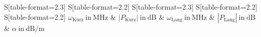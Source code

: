 \begin{table}
    \centering
    \caption{Frequenz $\omega$ und Betrag der Amplitude $P$ der Peaks in der FFT für das kurze und das lange Kabel, sowie mit \eqref{eq:Daempfung} berechnete Dämpfung}
    \label{tab:DaempfungWerte}
    \begin{tabular}{
	S[table-format=2.3]
	S[table-format=2.2]
	S[table-format=2.3]
	S[table-format=2.2]
	S[table-format=2.2]
	}
	\toprule
	{$\omega_\text{Kurz} \ \mathrm{in} \ \si{\mega\hertz}$}		& {$|P_\text{Kurz}| \ \mathrm{in} \ \si{\deci\bel}$}		& 
	{$\omega_\text{Lang} \ \mathrm{in} \ \si{\mega\hertz}$}		& {$|P_\text{Lang}| \ \mathrm{in} \ \si{\deci\bel}$}		& 
	{$\alpha \ \mathrm{in} \ \si{\deci\bel\per\meter}$}		\\ 
	\midrule
    
    \bottomrule
    \end{tabular}
    \end{table}
